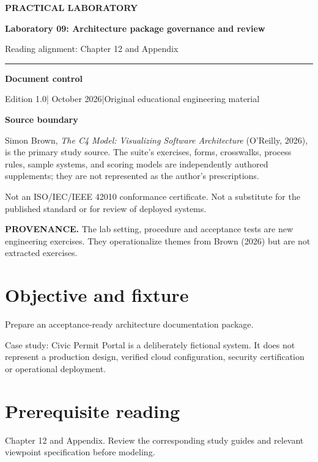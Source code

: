 \documentclass[10pt,letterpaper]{article}
\newcommand{\SourceNote}[1]{\par\smallskip\noindent\colorbox{C4Light}{\parbox{0.94\linewidth}{\footnotesize\textbf{PROVENANCE.} #1}}\par\medskip}
\newcommand{\DocStart}[3]{%
\begin{document}
\begin{titlepage}
\renewcommand{\thepage}{title-\arabic{page}}
\vspace*{0.55in}
{\sffamily\bfseries\small\color{C4Teal}#1}\par\vspace{0.24in}
{\sffamily\bfseries\fontsize{26}{31}\selectfont\color{C4Navy}#2}\par\vspace{0.18in}
{\large\color{C4Gray}#3}\par\vspace{0.4in}
\textcolor{C4Teal}{\rule{\linewidth}{1.15pt}}\par\vspace{0.24in}
\textbf{Document control}\par
Edition 1.0\quad|\quad 30 October 2026\quad|\quad Original educational engineering material\par
\vspace{0.17in}
\textbf{Source boundary}\par
Simon Brown, \emph{The C4 Model: Visualizing Software Architecture} (O'Reilly, 2026), is the primary study source. The suite's exercises, forms, crosswalks, process rules, sample systems, and scoring models are independently authored supplements; they are not represented as the author's prescriptions.\par
\vfill
{\small\color{C4Gray}Not an ISO/IEC/IEEE 42010 conformance certificate. Not a substitute for the published standard or for review of deployed systems.}\par
\end{titlepage}
}
\DocStart{PRACTICAL LABORATORY}{Laboratory 09: Architecture package governance and review}{Reading alignment: Chapter 12 and Appendix}
\SourceNote{The lab setting, procedure and acceptance tests are new engineering exercises. They operationalize themes from Brown (2026) but are not extracted exercises.}
\section{Objective and fixture}
Prepare an acceptance-ready architecture documentation package.

Case study: Civic Permit Portal is a deliberately fictional system. It does not represent a production design, verified cloud configuration, security certification or operational deployment.


\section{Prerequisite reading}
Chapter 12 and Appendix. Review the corresponding study guides and relevant viewpoint specification before modeling.
\end{document}
